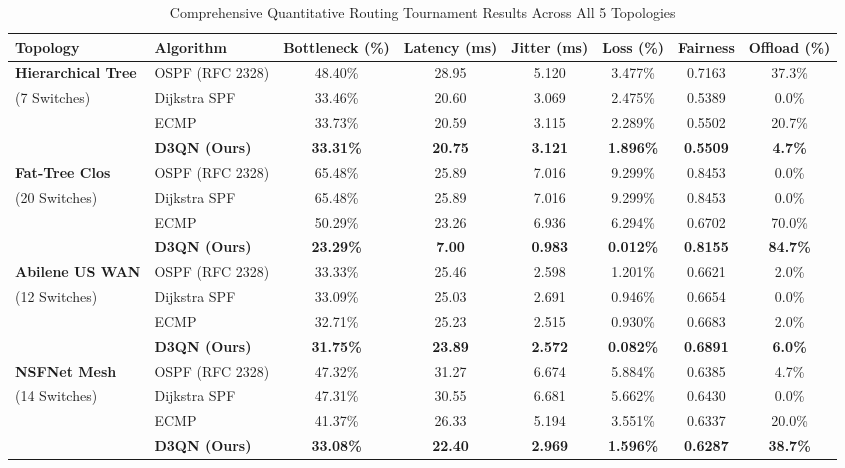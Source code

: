 \documentclass[12pt,a4paper,oneside]{report}
\begin{document}
\begin{table}[htbp]
\centering
\caption{Comprehensive Quantitative Routing Tournament Results Across All 5 Topologies}
\label{tab:tournament_results}
\scriptsize
\begin{tabularx}{\textwidth}{l l c c c c c c}
\toprule
\textbf{Topology} & \textbf{Algorithm} & \textbf{Bottleneck (\%)} & \textbf{Latency (ms)} & \textbf{Jitter (ms)} & \textbf{Loss (\%)} & \textbf{Fairness} & \textbf{Offload (\%)} \\
\midrule
\textbf{Hierarchical Tree} & OSPF (RFC 2328) & 48.40\% & 28.95 & 5.120 & 3.477\% & 0.7163 & 37.3\% \\
(7 Switches) & Dijkstra SPF & 33.46\% & 20.60 & 3.069 & 2.475\% & 0.5389 & 0.0\% \\
& ECMP & 33.73\% & 20.59 & 3.115 & 2.289\% & 0.5502 & 20.7\% \\
& \textbf{D3QN (Ours)} & \textbf{33.31\%} & \textbf{20.75} & \textbf{3.121} & \textbf{1.896\%} & \textbf{0.5509} & \textbf{4.7\%} \\
\midrule
\textbf{Fat-Tree Clos} & OSPF (RFC 2328) & 65.48\% & 25.89 & 7.016 & 9.299\% & 0.8453 & 0.0\% \\
(20 Switches) & Dijkstra SPF & 65.48\% & 25.89 & 7.016 & 9.299\% & 0.8453 & 0.0\% \\
& ECMP & 50.29\% & 23.26 & 6.936 & 6.294\% & 0.6702 & 70.0\% \\
& \textbf{D3QN (Ours)} & \textbf{23.29\%} & \textbf{7.00} & \textbf{0.983} & \textbf{0.012\%} & \textbf{0.8155} & \textbf{84.7\%} \\
\midrule
\textbf{Abilene US WAN} & OSPF (RFC 2328) & 33.33\% & 25.46 & 2.598 & 1.201\% & 0.6621 & 2.0\% \\
(12 Switches) & Dijkstra SPF & 33.09\% & 25.03 & 2.691 & 0.946\% & 0.6654 & 0.0\% \\
& ECMP & 32.71\% & 25.23 & 2.515 & 0.930\% & 0.6683 & 2.0\% \\
& \textbf{D3QN (Ours)} & \textbf{31.75\%} & \textbf{23.89} & \textbf{2.572} & \textbf{0.082\%} & \textbf{0.6891} & \textbf{6.0\%} \\
\midrule
\textbf{NSFNet Mesh} & OSPF (RFC 2328) & 47.32\% & 31.27 & 6.674 & 5.884\% & 0.6385 & 4.7\% \\
(14 Switches) & Dijkstra SPF & 47.31\% & 30.55 & 6.681 & 5.662\% & 0.6430 & 0.0\% \\
& ECMP & 41.37\% & 26.33 & 5.194 & 3.551\% & 0.6337 & 20.0\% \\
& \textbf{D3QN (Ours)} & \textbf{33.08\%} & \textbf{22.40} & \textbf{2.969} & \textbf{1.596\%} & \textbf{0.6287} & \textbf{38.7\%} \\

\end{tabularx}
\end{table}
\end{document}
